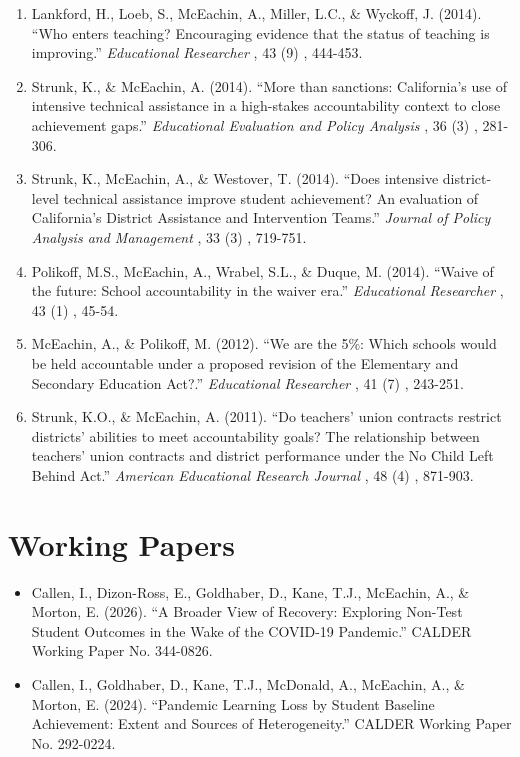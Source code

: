 \documentclass[11pt, letterpaper]{article}
\begin{document}
\begin{enumerate}[leftmargin=2em]
  \item Lankford, H., Loeb, S., McEachin, A., Miller, L.C., \& Wyckoff, J. (2014).
  ``Who enters teaching? Encouraging evidence that the status of teaching is improving.''
  \textit{Educational Researcher}%
, 43%
(9)%
, 444-453.

  \item Strunk, K., \& McEachin, A. (2014).
  ``More than sanctions: California's use of intensive technical assistance in a high-stakes accountability context to close achievement gaps.''
  \textit{Educational Evaluation and Policy Analysis}%
, 36%
(3)%
, 281-306.

  \item Strunk, K., McEachin, A., \& Westover, T. (2014).
  ``Does intensive district-level technical assistance improve student achievement? An evaluation of California's District Assistance and Intervention Teams.''
  \textit{Journal of Policy Analysis and Management}%
, 33%
(3)%
, 719-751.

  \item Polikoff, M.S., McEachin, A., Wrabel, S.L., \& Duque, M. (2014).
  ``Waive of the future: School accountability in the waiver era.''
  \textit{Educational Researcher}%
, 43%
(1)%
, 45-54.

  \item McEachin, A., \& Polikoff, M. (2012).
  ``We are the 5\%: Which schools would be held accountable under a proposed revision of the Elementary and Secondary Education Act?.''
  \textit{Educational Researcher}%
, 41%
(7)%
, 243-251.

  \item Strunk, K.O., \& McEachin, A. (2011).
  ``Do teachers' union contracts restrict districts' abilities to meet accountability goals? The relationship between teachers' union contracts and district performance under the No Child Left Behind Act.''
  \textit{American Educational Research Journal}%
, 48%
(4)%
, 871-903.

\end{enumerate}

\section{Working Papers}
\begin{itemize}
  \item Callen, I., Dizon-Ross, E., Goldhaber, D., Kane, T.J., McEachin, A., \& Morton, E. (2026).
  ``A Broader View of Recovery: Exploring Non-Test Student Outcomes in the Wake of the COVID-19 Pandemic.''
CALDER Working Paper No. 344-0826. 
  \item Callen, I., Goldhaber, D., Kane, T.J., McDonald, A., McEachin, A., \& Morton, E. (2024).
  ``Pandemic Learning Loss by Student Baseline Achievement: Extent and Sources of Heterogeneity.''
CALDER Working Paper No. 292-0224. 
\end{itemize}
\end{document}
